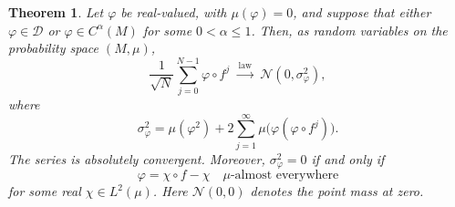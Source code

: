 \documentclass[11pt,reqno]{amsart}
\theoremstyle{plain}
\newtheorem{theorem}{Theorem}[section]
\theoremstyle{definition}
\theoremstyle{remark}
\newcommand{\Dcal}{\mathcal D}
\numberwithin{equation}{section}
\begin{document}
\begin{theorem}\label{thm:CLT}
Let $\varphi$ be real-valued, with $\mu(\varphi)=0$, and suppose that either $\varphi\in\Dcal$ or $\varphi\in C^\alpha(M)$ for some $0<\alpha\le1$. Then, as random variables on the probability space $(M,\mu)$,
\begin{equation}\label{eq:CLT}
 \frac1{\sqrt N}\sum_{j=0}^{N-1}\varphi\circ f^j
 \ \xrightarrow{\ \mathrm{law}\ }\ \mathcal N(0,\sigma_\varphi^2),
\end{equation}
where
\begin{equation}\label{eq:variance}
 \sigma_\varphi^2=\mu(\varphi^2)
 +2\sum_{j=1}^{\infty}\mu\big(\varphi(\varphi\circ f^j)\big).
\end{equation}
The series is absolutely convergent. Moreover, $\sigma_\varphi^2=0$ if and only if
\[
 \varphi=\chi\circ f-\chi
 \quad\mu\text{-almost everywhere}
\]
for some real $\chi\in L^2(\mu)$. Here $\mathcal N(0,0)$ denotes the point mass at zero.
\end{theorem}
\end{document}
